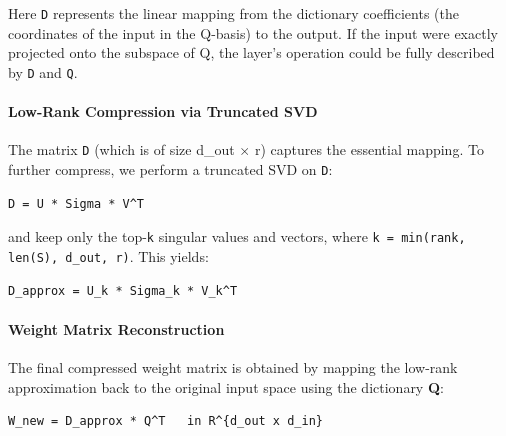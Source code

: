 Here \texttt{D} represents the linear mapping from the dictionary coefficients (the coordinates of the input in the Q-basis) to the output. If the input were exactly projected onto the subspace of Q, the layer's operation could be fully described by \texttt{D} and \texttt{Q}.

\paragraph{Low-Rank Compression via Truncated SVD}

The matrix \texttt{D} (which is of size d\_out $\times$ r) captures the essential mapping. To further compress, we perform a truncated SVD on \texttt{D}:

\vspace{0.5em}
\begin{mdframed}[backgroundcolor=codebg, linecolor=codeframe, linewidth=1pt, roundcorner=4pt, innerleftmargin=2pt, innerrightmargin=5pt, innertopmargin=5pt, innerbottommargin=5pt]
\begin{lstlisting}
D = U * Sigma * V^T
\end{lstlisting}
\end{mdframed}
\vspace{0.5em}

and keep only the top-\texttt{k} singular values and vectors, where \texttt{k = min(rank, len(S), d\_out, r)}. This yields:

\vspace{0.5em}
\begin{mdframed}[backgroundcolor=codebg, linecolor=codeframe, linewidth=1pt, roundcorner=4pt, innerleftmargin=2pt, innerrightmargin=5pt, innertopmargin=5pt, innerbottommargin=5pt]
\begin{lstlisting}
D_approx = U_k * Sigma_k * V_k^T
\end{lstlisting}
\end{mdframed}
\vspace{0.5em}

\paragraph{Weight Matrix Reconstruction}

The final compressed weight matrix is obtained by mapping the low-rank approximation back to the original input space using the dictionary \textbf{Q}:

\vspace{0.5em}
\begin{mdframed}[backgroundcolor=codebg, linecolor=codeframe, linewidth=1pt, roundcorner=4pt, innerleftmargin=2pt, innerrightmargin=5pt, innertopmargin=5pt, innerbottommargin=5pt]
\begin{lstlisting}
W_new = D_approx * Q^T   in R^{d_out x d_in}
\end{lstlisting}
\end{mdframed}
\vspace{0.5em}

